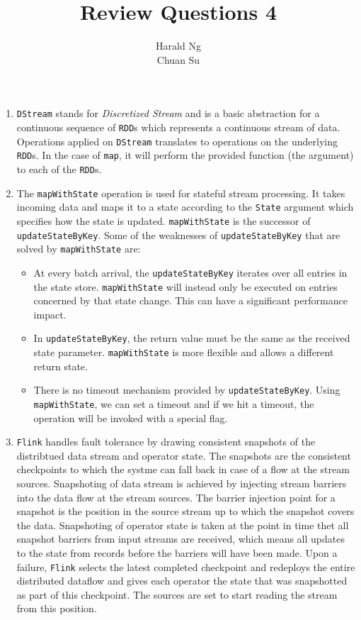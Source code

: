 \documentclass[12pt]{article}
\begin{document}
\title{Review Questions 4}
\author{Harald Ng \\
        Chuan Su}

\maketitle
\begin{enumerate}
    \item \texttt{DStream} stands for \textit{Discretized Stream} and is a basic abstraction for a continuous sequence of \texttt{RDD}s which represents a continuous stream of data. Operations applied on \texttt{DStream} translates to operations on the underlying \texttt{RDD}s. In the case of \texttt{map}, it will perform the provided function (the argument) to each of the \texttt{RDD}s.

    \item The \texttt{mapWithState} operation is used for stateful stream processing. It takes incoming data and maps it to a state according to the \texttt{State} argument which specifies how the state is updated. \texttt{mapWithState} is the successor of \texttt{updateStateByKey}. Some of the weaknesses of \texttt{updateStateByKey} that are solved by \texttt{mapWithState} are:
    \begin{itemize}
        \item At every batch arrival, the \texttt{updateStateByKey} iterates over all entries in the state store. \texttt{mapWithState} will instead only be executed on entries concerned by that state change. This can have a significant performance impact.
        
        \item In \texttt{updateStateByKey}, the return value must be the same as the received state parameter. \texttt{mapWithState} is more flexible and allows a different return state.
        
        \item There is no timeout mechanism provided by \texttt{updateStateByKey}. Using \texttt{mapWithState}, we can set a timeout and if we hit a timeout, the operation will be invoked with a special flag.
    \end{itemize}

    \item \texttt{Flink} handles fault tolerance by drawing consistent snapshots of the distribtued data stream and operator state. The snapshots are the consistent checkpoints to which the systme can fall back in case of a flow at the stream sources.
      Snapshoting of data stream is achieved by injecting stream barriers into the data flow at the stream sources. The barrier injection point for a snapshot is the position in the source stream up to which the snapshot covers the data. Snapshoting of operator state is taken at the point in time thet all snapshot barriers from input streams are received, which means all updates to the state from records before the barriers will have been made.
     Upon a failure, \texttt{Flink} selects the latest completed checkpoint and redeploys the entire distributed dataflow and gives each operator the state that was snapshotted as part of this checkpoint. The sources are set to start reading the stream from this position.


\end{enumerate}
\end{document}
